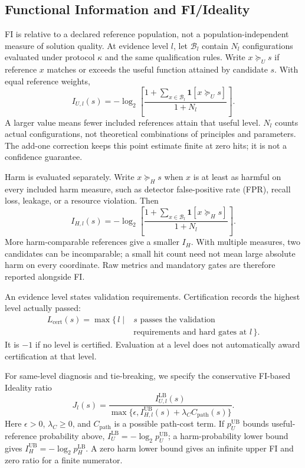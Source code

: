 \documentclass[sigconf]{acmart}
\begin{document}
\subsection{Functional Information and FI/Ideality}
\label{sec:fi}

FI is relative to a declared reference population, not a
population-independent measure of solution quality. At evidence level $l$,
let $\mathcal{B}_l$ contain $N_l$ configurations evaluated under protocol
$\kappa$ and the same qualification rules. Write $x\succeq_U s$ if reference
$x$ matches or exceeds the useful function attained by candidate $s$.
With equal reference weights,
\begin{equation}
I_{U,l}(s)=-\log_2\!\left[
\frac{1+\sum_{x\in\mathcal{B}_l}\mathbf{1}[x\succeq_U s]}{1+N_l}
\right].
\label{eq:usefulfi}
\end{equation}
A larger value means fewer included references attain that useful level.
$N_l$ counts actual configurations, not theoretical combinations of
principles and parameters. The add-one correction keeps this point
estimate finite at zero hits; it is not a confidence guarantee.

Harm is evaluated separately. Write $x\succeq_H s$ when $x$ is at least
as harmful on every included harm measure, such as detector false-positive
rate (FPR), recall loss, leakage, or a resource violation. Then
\begin{equation}
I_{H,l}(s)=-\log_2\!\left[
\frac{1+\sum_{x\in\mathcal{B}_l}\mathbf{1}[x\succeq_H s]}{1+N_l}
\right].
\label{eq:harmfi}
\end{equation}
More harm-comparable references give a smaller $I_H$. With multiple measures,
two candidates can be incomparable; a small hit count need not mean large
absolute harm on every coordinate. Raw metrics and mandatory gates are
therefore reported alongside FI.

An evidence level states validation requirements. Certification records
the highest level actually passed:
\begin{equation}
\begin{aligned}
L_{\mathrm{cert}}(s)=\max\{\,l\mid&s\text{ passes the validation}\\
&\text{requirements and hard gates at }l\,\}.
\end{aligned}
\label{eq:certlevel}
\end{equation}
It is $-1$ if no level is certified. Evaluation at a level does not
automatically award certification at that level.

For same-level diagnosis and tie-breaking, we specify the conservative
FI-based Ideality ratio
\begin{equation}
J_l(s)=
\frac{I_{U,l}^{\mathrm{LB}}(s)}
{\max\{\epsilon,I_{H,l}^{\mathrm{UB}}(s)+\lambda_C C_{\mathrm{path}}(s)\}}.
\label{eq:ideality}
\end{equation}
Here $\epsilon>0$, $\lambda_C\geq0$, and $C_{\mathrm{path}}$ is a possible
path-cost term. If $p_U^{\mathrm{UB}}$ bounds useful-reference probability
above, $I_U^{\mathrm{LB}}=-\log_2p_U^{\mathrm{UB}}$; a harm-probability
lower bound gives $I_H^{\mathrm{UB}}=-\log_2p_H^{\mathrm{LB}}$.
A zero harm lower bound gives an infinite upper FI and zero ratio for a
finite numerator.
\end{document}
